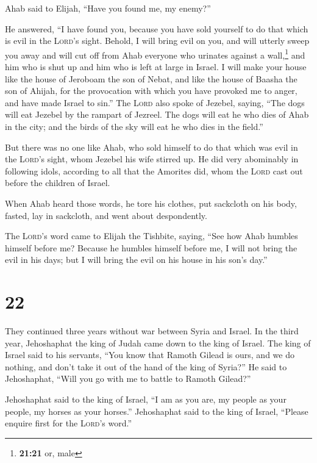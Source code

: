  Ahab said to Elijah, ``Have you found me, my enemy?''

He answered, ``I have found you, because you have sold yourself to do
that which is evil in the \textsc{Lord}'s sight.  Behold,
I will bring evil on you, and will utterly sweep you away and will cut
off from Ahab everyone who urinates against a wall,\footnote{\textbf{21:21}
  or, male} and him who is shut up and him who is left at large in
Israel.  I will make your house like the house of
Jeroboam the son of Nebat, and like the house of Baasha the son of
Ahijah, for the provocation with which you have provoked me to anger,
and have made Israel to sin.''  The \textsc{Lord} also
spoke of Jezebel, saying, ``The dogs will eat Jezebel by the rampart of
Jezreel.  The dogs will eat he who dies of Ahab in the
city; and the birds of the sky will eat he who dies in the field.''

 But there was no one like Ahab, who sold himself to do
that which was evil in the \textsc{Lord}'s sight, whom Jezebel his wife
stirred up.  He did very abominably in following idols,
according to all that the Amorites did, whom the \textsc{Lord} cast out
before the children of Israel.

 When Ahab heard those words, he tore his clothes, put
sackcloth on his body, fasted, lay in sackcloth, and went about
despondently.

 The \textsc{Lord}'s word came to Elijah the Tishbite,
saying,  ``See how Ahab humbles himself before me?
Because he humbles himself before me, I will not bring the evil in his
days; but I will bring the evil on his house in his son's day.''

\hypertarget{section-21}{%
\section{22}\label{section-21}}

 They continued three years without war between Syria and
Israel.  In the third year, Jehoshaphat the king of Judah
came down to the king of Israel.  The king of Israel said
to his servants, ``You know that Ramoth Gilead is ours, and we do
nothing, and don't take it out of the hand of the king of Syria?''
 He said to Jehoshaphat, ``Will you go with me to battle
to Ramoth Gilead?''

Jehoshaphat said to the king of Israel, ``I am as you are, my people as
your people, my horses as your horses.''  Jehoshaphat said
to the king of Israel, ``Please enquire first for the \textsc{Lord}'s
word.''

